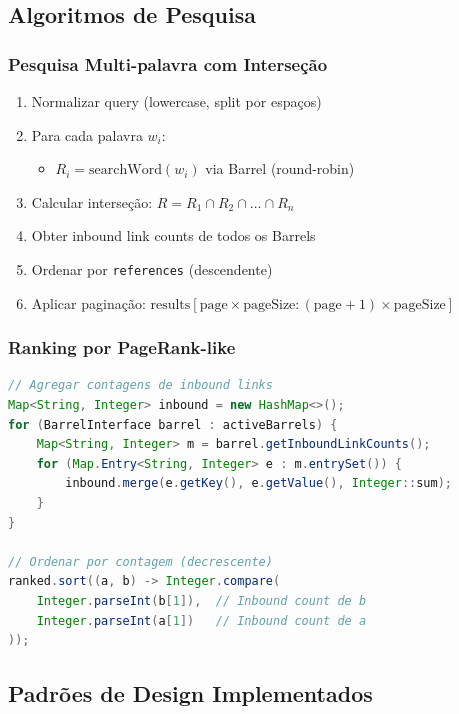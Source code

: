 \documentclass[12pt,a4paper]{article}
\begin{document}
\subsection{Algoritmos de Pesquisa}

\subsubsection{Pesquisa Multi-palavra com Interseção}
\begin{enumerate}
    \item Normalizar query (lowercase, split por espaços)
    \item Para cada palavra $w_i$:
    \begin{itemize}
        \item $R_i = \text{searchWord}(w_i)$ via Barrel (round-robin)
    \end{itemize}
    \item Calcular interseção: $R = R_1 \cap R_2 \cap \ldots \cap R_n$
    \item Obter inbound link counts de todos os Barrels
    \item Ordenar por \texttt{references} (descendente)
    \item Aplicar paginação: $\text{results}[\text{page} \times \text{pageSize} : (\text{page}+1) \times \text{pageSize}]$
\end{enumerate}

\subsubsection{Ranking por PageRank-like}
\begin{lstlisting}[language=Java, caption={Algoritmo de ranking}]
// Agregar contagens de inbound links
Map<String, Integer> inbound = new HashMap<>();
for (BarrelInterface barrel : activeBarrels) {
    Map<String, Integer> m = barrel.getInboundLinkCounts();
    for (Map.Entry<String, Integer> e : m.entrySet()) {
        inbound.merge(e.getKey(), e.getValue(), Integer::sum);
    }
}

// Ordenar por contagem (decrescente)
ranked.sort((a, b) -> Integer.compare(
    Integer.parseInt(b[1]),  // Inbound count de b
    Integer.parseInt(a[1])   // Inbound count de a
));
\end{lstlisting}

\subsection{Padrões de Design Implementados}
\end{document}
